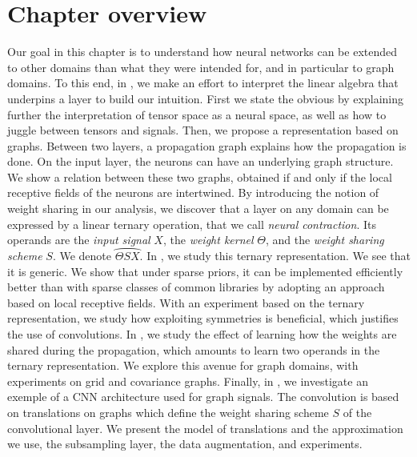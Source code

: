 \section*{Chapter overview}

Our goal in this chapter is to understand how neural networks can be extended to other domains than what they were intended for, and in particular to graph domains. To this end, in , we make an effort to interpret the linear algebra that underpins a layer to build our intuition. First we state the obvious by explaining further the interpretation of tensor space as a neural space, as well as how to juggle between tensors and signals. Then, we propose a representation based on graphs. Between two layers, a propagation graph explains how the propagation is done. On the input layer, the neurons can have an underlying graph structure. We show a relation between these two graphs, obtained if and only if the local receptive fields of the neurons are intertwined. By introducing the notion of weight sharing in our analysis, we discover that a layer on any domain can be expressed by a linear ternary operation, that we call \emph{neural contraction}. Its operands are the \emph{input signal} $X$, the \emph{weight kernel} $\Theta$, and the \emph{weight sharing scheme} $S$. We denote $\wideparen{\Theta S X}$. In , we study this ternary representation. We see that it is generic. We show that under sparse priors, it can be implemented efficiently better than with sparse classes of common libraries by adopting an approach based on local receptive fields. With an experiment based on the ternary representation, we study how exploiting symmetries is beneficial, which justifies the use of convolutions. In , we study the effect of learning how the weights are shared during the propagation, which amounts to learn two operands in the ternary representation. We explore this avenue for graph domains, with experiments on grid and covariance graphs. Finally, in , we investigate an exemple of a CNN architecture used for graph signals. The convolution is based on translations on graphs which define the weight sharing scheme $S$ of the convolutional layer. We present the model of translations and the approximation we use, the subsampling layer, the data augmentation, and experiments.
